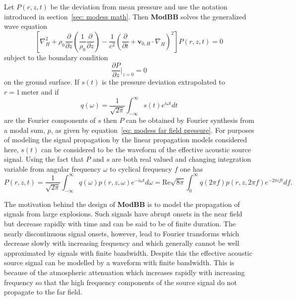 Let $P(r,z,t)$ be the deviation from mean pressure and use the notation introduced in section~\ref{sec: modess math}. Then {\bf ModBB} solves the generalized wave equation 
\begin{equation}
\left[  
\nabla_{H}^2 + \rho_0 \frac{\partial}{\partial z} \left ( \frac{1}{\rho_0} \frac{\partial}{\partial z} \right ) -\frac{1}{c^2} (\frac{\partial }{\partial t} + \textbf{v}_{0,H} \cdot \nabla_{H})^2 
\right] P(r,z,t) = 0 
\label{eq: wave_eqn}
\end{equation}
subject to the boundary condition 
\[
\frac {\partial P}{\partial z}\Big |_{z=0}= 0
\]
on the ground surface. If $s(t)$ is the pressure deviation extrapolated to $r=1\ \text{meter}$ and if 
\[
q(\omega)=\frac{1}{\sqrt{2\pi}}\int_{-\infty}^{\infty}s(t)e^{i\omega t} dt 
\]
are the Fourier components of $s$ then $P$ can be obtained by Fourier synthesis from a modal sum, $p$, as given by equation~\ref{eq: modess far field pressure}. For purposes of modeling the signal propagation by the linear propagation models considered here, $s(t)$ can be considered to be the waveform of the effective acoustic source signal. Using the fact that $P$ and $s$ are both real valued and changing integration variable from angular frequency $\omega$ to cyclical frequency $f$ one has 
\[
P(r,z,t) = \frac{1}{\sqrt{2\pi}}\int_{-\infty}^{\infty} q(\omega)p(r,z,\omega)e^{-i\omega t} d\omega 
= \text{Re}\sqrt{8\pi}\int_{0}^{\infty} q(2\pi f)p(r,z,2\pi f)e^{-2\pi ift} df .
\]


The motivation behind the design of {\bf ModBB} is to model the propagation of signals from large explosions. Such signals have abrupt onsets in the near field but decrease rapidly with time and can be said to be of finite duration. The nearly discontinuous signal onsets, however, lead to Fourier transforms which decrease slowly with increasing frequency and which generally cannot be well approximated by signals with finite bandwidth. Despite this the effective acoustic source signal can be modelled by a waveform with finite bandwidth. This is because of the atmospheric attenuation which increases rapidly with increasing frequency so that the high frequency components of the source signal do not propagate to the far field. 

